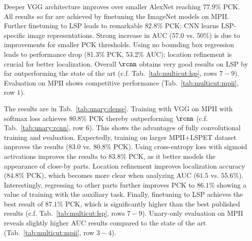Deeper VGG architecture improves over smaller AlexNet reaching
$77.9$\% PCK. All results so far are achieved by finetuning the
ImageNet models on MPII. Further finetuning to LSP leads to remarkable
82.8\% PCK: CNN learns LSP-specific image representations.
Strong increase in AUC (57.0 vs. 50\%) is due to improvements for
smaller PCK thresholds. Using no bounding box regression leads to
performance drop (81.3\% PCK, 53.2\% AUC): location refinement is
crucial for better localization. Overall $\rcnn$ obtains very good
results on LSP by far outperforming the state of the art
(c.f. Tab.~\ref{tab:multicut:lsp}, rows $7-9$). Evaluation on MPII
shows competitive performance (Tab.~\ref{tab:multicut:mpii}, row $1$).



 The results are in Tab.~\ref{tab:unary:dense}.
Training with VGG on MPII with softmax loss achieves $80.8$\% PCK
thereby outperforming $\rcnn$ (c.f. Tab.~\ref{tab:unary:rcnn}, row
6). This shows the advantages of fully convolutional training and
evaluation.
Expectedly, training on larger MPII+LSPET dataset improves the results
($83.0$ vs. $80.8$\% PCK). Using cross-entropy loss with sigmoid
activations improves the results to $83.8$\% PCK, as it better models
the appearance of close-by parts. Location refinement improves
localization accuracy ($84.8$\% PCK), which becomes more clear when
analyzing AUC ($61.5$ vs. $55.6$\%). Interestingly, regressing to other
parts further improves PCK to $86.1$\% showing a value of training
with the auxiliary task. Finally, finetuning to LSP achieves the best
result of $87.1$\% PCK, which is significantly higher than the best
published results (c.f. Tab.~\ref{tab:multicut:lsp}, rows
$7-9$). Unary-only evaluation on MPII reveals slightly higher AUC
results compared to the state of the art
(Tab.~\ref{tab:multicut:mpii}, row $3-4$).

